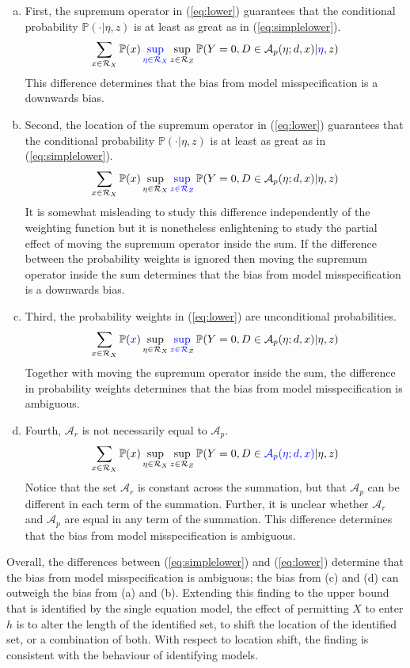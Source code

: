 \documentclass[12pt,a4paper,twoside]{article}
\numberwithin{equation}{section}
\begin{document}
\begin{enumerate}[(a)]
\item First, the supremum operator in (\ref{eq:lower}) guarantees that the conditional probability $\mathbb{P}(\cdot|\eta,z)$ is at least as great as in (\ref{eq:simplelower}).
\[\sum_{x\in\mathcal{R}_X}\mathbb{P}(\color{black}x\color{black})\color{blue}\sup_{\eta\in\mathcal{R}_X}\color{black}\sup_{z\in\mathcal{R}_Z}\color{black}\mathbb{P}(Y=0,D\in\color{black}\mathcal{A}_p(\eta;d,x)\color{black}|\color{blue}\eta\color{black},z)\]
This difference determines that the bias from model misspecification is a downwards bias. 
\item Second, the location of the supremum operator in (\ref{eq:lower}) guarantees that the conditional probability $\mathbb{P}(\cdot|\eta,z)$ is at least as great as in (\ref{eq:simplelower}).
\[\sum_{x\in\mathcal{R}_X}\mathbb{P}(\color{black}x\color{black})\color{black}\sup_{\eta\in\mathcal{R}_X}\color{blue}\sup_{z\in\mathcal{R}_Z}\color{black}\mathbb{P}(Y=0,D\in\color{black}\mathcal{A}_p(\eta;d,x)\color{black}|\color{black}\eta\color{black},z)\]
It is somewhat misleading to study this difference independently of the weighting function but it is nonetheless enlightening to study the partial effect of moving the supremum operator inside the sum. If the difference between the probability weights is ignored then moving the supremum operator inside the sum determines that the bias from model misspecification is a downwards bias.
\item Third, the probability weights in (\ref{eq:lower}) are unconditional probabilities.
\[\sum_{x\in\mathcal{R}_X}\mathbb{P}(\color{blue}x\color{black})\color{black}\sup_{\eta\in\mathcal{R}_X}\color{blue}\sup_{z\in\mathcal{R}_Z}\color{black}\mathbb{P}(Y=0,D\in\color{black}\mathcal{A}_p(\eta;d,x)\color{black}|\color{black}\eta\color{black},z)\]
Together with moving the supremum operator inside the sum, the difference in probability weights determines that the bias from model misspecification is ambiguous. 
\item Fourth, $\mathcal{A}_r$ is not necessarily equal to $\mathcal{A}_p$.
\[\sum_{x\in\mathcal{R}_X}\mathbb{P}(\color{black}x\color{black})\color{black}\sup_{\eta\in\mathcal{R}_X}\color{black}\sup_{z\in\mathcal{R}_Z}\color{black}\mathbb{P}(Y=0,D\in\color{blue}\mathcal{A}_p(\eta;d,x)\color{black}|\color{black}\eta\color{black},z)\] 
Notice that the set $\mathcal{A}_r$ is constant across the summation, but that $\mathcal{A}_p$ can be different in each term of the summation. Further, it is unclear whether $\mathcal{A}_r$ and $\mathcal{A}_p$ are equal in any term of the summation. This difference determines that the bias from model misspecification is ambiguous.
\end{enumerate} 
Overall, the  differences between (\ref{eq:simplelower}) and (\ref{eq:lower}) determine that the bias from model misspecification is ambiguous; the bias from (c) and (d) can outweigh the bias from (a) and (b). Extending this finding to the upper bound that is identified by the single equation model, the effect of permitting $X$ to enter $h$ is to alter the length of the identified set, to shift the location of the identified set, or a combination of both. With respect to location shift, the finding is consistent with the behaviour of identifying models.  
\end{document}
